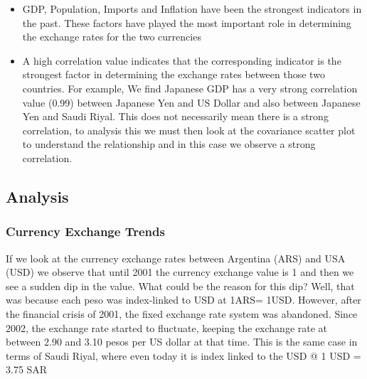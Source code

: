 \begin{itemize}
\item GDP, Population, Imports and Inflation have been the strongest indicators in the past\cite{edwards2006relationship}. These factors have played the most important role in determining the exchange rates for the two currencies
\item A high correlation value indicates that the corresponding indicator is the strongest factor in determining the exchange rates between those two countries\cite{burstein2005large}. For example, We find Japanese GDP has a very strong correlation value (0.99) between Japanese Yen and US Dollar and also between Japanese Yen and Saudi Riyal.  This does not necessarily mean there is a strong correlation, to analysis this we must then look at the covariance scatter plot to understand the relationship and in this case we observe a strong correlation.


\end{itemize}
\subsection{Analysis}
\subsubsection{Currency Exchange Trends}
If we look at the currency exchange rates between Argentina (ARS) and USA (USD) we observe that until 2001 the currency exchange value is 1 and then we see a sudden dip in the value. What could be the reason for this dip? Well, that was because each peso was index-linked to USD at 1ARS= 1USD. However, after the financial crisis of 2001, the fixed exchange rate system was abandoned. Since 2002, the exchange rate started to fluctuate, keeping the exchange rate at between 2.90 and 3.10 pesos per US dollar at that time.  
This is the same case in terms of Saudi Riyal, where even today it is index linked to the USD @ 1 USD = 3.75 SAR 
